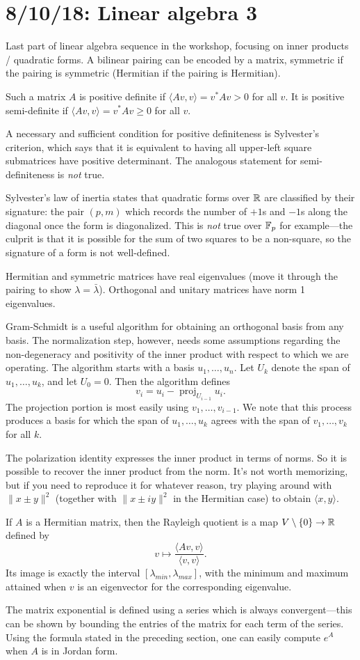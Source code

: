 \section{8/10/18: Linear algebra 3}
Last part of linear algebra sequence in the workshop, focusing on inner products / quadratic forms. A bilinear pairing can be encoded by a matrix, symmetric if the pairing is symmetric (Hermitian if the pairing is Hermitian).

Such a matrix $A$ is positive definite if $\langle Av,v \rangle = v^* A v > 0$ for all $v$. It is positive semi-definite if $\langle Av,v \rangle = v^* A v \geq 0$ for all $v$.

A necessary and sufficient condition for positive definiteness is Sylvester's criterion, which says that it is equivalent to having all upper-left square submatrices have positive determinant. The analogous statement for semi-definiteness is \emph{not} true.

Sylvester's law of inertia states that quadratic forms over $\mathbb{R}$ are classified by their signature: the pair $(p,m)$ which records the number of $+1$s and $-1$s along the diagonal once the form is diagonalized. This is \emph{not} true over $\mathbb{F}_p$ for example---the culprit is that it is possible for the sum of two squares to be a non-square, so the signature of a form is not well-defined.

Hermitian and symmetric matrices have real eigenvalues (move it through the pairing to show $\lambda = \bar{\lambda}$). Orthogonal and unitary matrices have norm 1 eigenvalues.

Gram-Schmidt is a useful algorithm for obtaining an orthogonal basis from any basis. The normalization step, however, needs some assumptions regarding the non-degeneracy and positivity of the inner product with respect to which we are operating. The algorithm starts with a basis $u_1,\ldots,u_n$. Let $U_k$ denote the span of $u_1,\ldots,u_k$, and let $U_0 = 0$. Then the algorithm defines
\[
	v_i = u_i - \operatorname{proj}_{U_{i-1}} u_i.
\]
The projection portion is most easily using $v_1,\ldots,v_{i-1}$. We note that this process produces a basis for which the span of $u_1,\ldots,u_k$ agrees with the span of $v_1,\ldots,v_k$ for all $k$. 

The polarization identity expresses the inner product in terms of norms. So it is possible to recover the inner product from the norm. It's not worth memorizing, but if you need to reproduce it for whatever reason, try playing around with $\lVert x \pm y \rVert^2$ (together with $\lVert x \pm iy \rVert^2$ in the Hermitian case) to obtain $\langle x,y \rangle$.

If $A$ is a Hermitian matrix, then the Rayleigh quotient is a map $V \setminus \{0\} \to \mathbb{R}$ defined by
\[
	v \mapsto \frac{\langle Av,v \rangle}{\langle v,v \rangle}.
\]
Its image is exactly the interval $[\lambda_{min},\lambda_{max}]$, with the minimum and maximum attained when $v$ is an eigenvector for the corresponding eigenvalue.

The matrix exponential is defined using a series which is always convergent---this can be shown by bounding the entries of the matrix for each term of the series. Using the formula stated in the preceding section, one can easily compute $e^A$ when $A$ is in Jordan form.